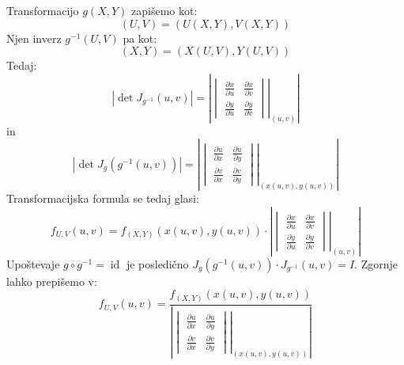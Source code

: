 \documentclass[12pt]{book}
\def\n{\noindent}
\theoremstyle{definition}
\theoremstyle{plain}
\theoremstyle{plain}
\theoremstyle{plain}
\theoremstyle{plain}
\theoremstyle{remark}
\begin{document}
\n Transformacijo $g(X, Y)$ zapišemo kot:
$$
(U, V)=(U(X, Y), V(X, Y))
$$
Njen inverz $g^{-1}(U,V)$ pa kot: 
$$
(X, Y)=(X(U, V), Y(U, V))
$$
Tedaj: 
$$
|\det J_{g^{-1}}(u, v)| = \left\lvert\left.\begin{vmatrix}
    \frac{\partial x}{\partial u} & \frac{\partial x}{\partial v} \\
    \frac{\partial y}{\partial u} & \frac{\partial y}{\partial v}
    \end{vmatrix}\right|_{(u, v)} \right\rvert
$$
in
$$
|\det J_{g}(g^{-1}(u, v))| = \left\lvert\left.\begin{vmatrix}
    \frac{\partial u}{\partial x} & \frac{\partial u}{\partial y} \\
    \frac{\partial v}{\partial x} & \frac{\partial v}{\partial y}
    \end{vmatrix}\right|_{(x(u, v), y(u, v))} \right\rvert
$$
Transformacijska formula se tedaj glasi: 
$$
f_{U, V}(u, v)=f_{(X, Y)}(x(u, v), y(u, v)) \cdot \left\lvert\left.\begin{vmatrix}
    \frac{\partial x}{\partial u} & \frac{\partial x}{\partial v} \\
    \frac{\partial y}{\partial u} & \frac{\partial y}{\partial v}
    \end{vmatrix}\right|_{(u, v)} \right\rvert
$$
Upoštevaje $g \circ g^{-1}=\operatorname{id}$ je posledično $J_g\left(g^{-1}(u, v)\right) \cdot J_{g^{-1}}(u, v)=I$. Zgornje lahko prepišemo v: 
$$
f_{U, V}(u, v)=\frac{f_{(X, Y)}(x(u, v), y(u, v))}{\left\lvert\left.\begin{vmatrix}
    \frac{\partial u}{\partial x} & \frac{\partial u}{\partial y} \\
    \frac{\partial v}{\partial x} & \frac{\partial v}{\partial y}
    \end{vmatrix}\right|_{(x(u, v), y(u, v))} \right\rvert}
$$
\end{document}
